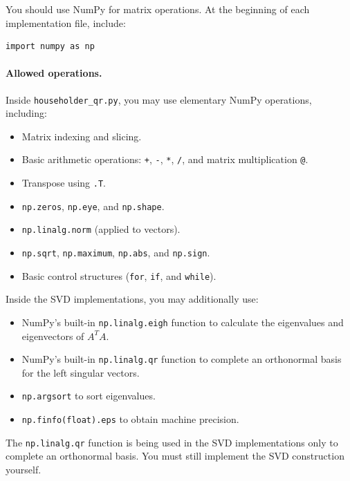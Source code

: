 \documentclass{ximera}
\begin{document}
You should use NumPy for matrix operations. At the beginning of
each implementation file, include:

\begin{verbatim}
import numpy as np
\end{verbatim}

\paragraph{Allowed operations.}

Inside \texttt{householder\_qr.py}, you may use elementary NumPy
operations, including:

\begin{itemize}
    \item Matrix indexing and slicing.
    \item Basic arithmetic operations: \texttt{+}, \texttt{-},
    \texttt{*}, \texttt{/}, and matrix multiplication \texttt{@}.
    \item Transpose using \texttt{.T}.
    \item \texttt{np.zeros}, \texttt{np.eye}, and \texttt{np.shape}.
    \item \texttt{np.linalg.norm} (applied to vectors).
    \item \texttt{np.sqrt}, \texttt{np.maximum}, \texttt{np.abs},
    and \texttt{np.sign}.
    \item Basic control structures (\texttt{for}, \texttt{if},
    and \texttt{while}).
\end{itemize}

Inside the SVD implementations, you may additionally use:

\begin{itemize}
    \item NumPy's built-in \texttt{np.linalg.eigh} function to
    calculate the eigenvalues and eigenvectors of $A^TA$.
    \item NumPy's built-in \texttt{np.linalg.qr} function to
    complete an orthonormal basis for the left singular vectors.
    \item \texttt{np.argsort} to sort eigenvalues.
    \item \texttt{np.finfo(float).eps} to obtain machine precision.
\end{itemize}

The \texttt{np.linalg.qr} function is being used in the SVD
implementations only to complete an orthonormal basis. You must
still implement the SVD construction yourself.
\end{document}
